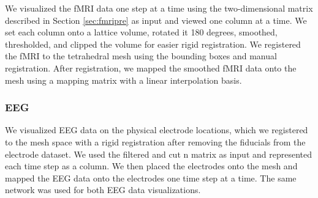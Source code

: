 We visualized the fMRI data one step at a time using the two-dimensional matrix described in Section \ref{sec:fmripre} as input and viewed one column at a time. We set each column onto a lattice volume, rotated it 180 degrees, smoothed, thresholded, and clipped the volume for easier rigid registration. We registered the fMRI to the tetrahedral mesh using the bounding boxes and manual registration. After registration, we mapped the smoothed fMRI data onto the mesh using a mapping matrix with a linear interpolation basis.

\subsubsection{EEG}

We visualized EEG data on the physical electrode locations, which we registered to the mesh space with a rigid registration after removing the fiducials from the electrode dataset. We used the filtered and cut n matrix as input and represented each time step as a column. We then placed the electrodes onto the mesh and mapped the EEG data onto the electrodes one time step at a time. The same network was used for both EEG data visualizations.